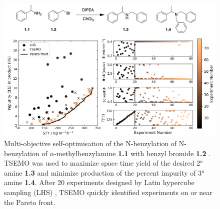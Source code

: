 \begin{figure}
    \centering
    \includegraphics[width=\textwidth]{gfx/Chapter03/schweidtmann_thesis.png}
    \caption{Multi-objective self-optimisation of the N-benzylation of N-benzylation of $\alpha$-methylbenzylamine \textbf{1.1} with benzyl bromide \textbf{1.2} \cite{Schweidtmann2018}. TSEMO \cite{Bradford2018} was used to maximize space time yield of the desired 2° amine \textbf{1.3} and minimize production of the percent impurity of 3° amine \textbf{1.4}. After 20 experiments designed by Latin hypercube sampling (LHS) \cite{McKay1979}, TSEMO quickly identified experiments on or near the Pareto front.}
    \label{fig:schweidtmann_example}
\end{figure}



